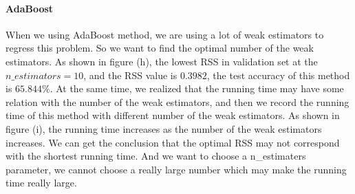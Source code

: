 \documentclass{article}
\begin{document}
\paragraph{AdaBoost}
When we using AdaBoost method, we are using a lot of weak estimators to regress this problem. So we want to find the optimal number of the weak estimators. As shown in figure (h), the lowest RSS in validation set at the $n\_estimators =10$, and the RSS value is $0.3982$, the test accuracy of this method is $65.844\%$. At the same time, we realized that the running time may have some relation with the number of the weak estimators, and then we record the running time of this method with different number of the weak estimators. As shown in figure (i), the running time increases as the number of the weak estimators increases. We can get the conclusion that the optimal RSS may not correspond with the shortest running time. And we want to choose a n\_estimaters parameter, we cannot choose a really large number which may make the running time really large.
\end{document}

